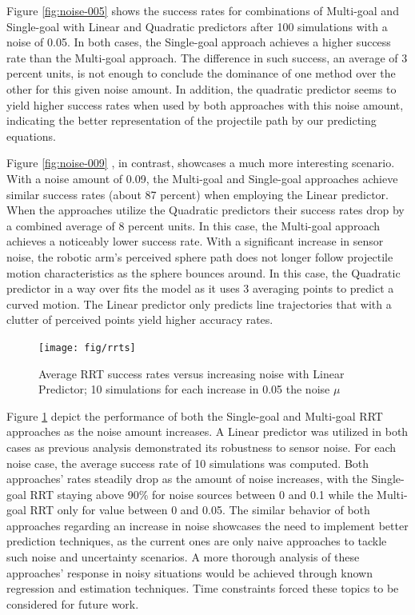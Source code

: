 \documentclass[letterpaper, 10 pt, conference]{ieeeconf}  %
\begin{document}
Figure \ref{fig:noise-005} shows the success rates for combinations of
Multi-goal and Single-goal with Linear and Quadratic predictors after
100 simulations with a noise of 0.05. In both cases, the Single-goal
approach achieves a higher success rate than the Multi-goal approach.
The difference in such success, an average of 3 percent units, is not
enough to conclude the dominance of one method over the other for this
given noise amount. In addition, the quadratic predictor seems to yield
higher success rates when used by both approaches with this noise
amount, indicating the better representation of the projectile path by
our predicting equations.

Figure \ref{fig:noise-009} , in contrast, showcases a much more
interesting scenario. With a noise amount of 0.09, the Multi-goal and
Single-goal approaches achieve similar success rates (about 87 percent)
when employing the Linear predictor. When the approaches utilize the
Quadratic predictors their success rates drop by a combined average of 8
percent units. In this case, the Multi-goal approach achieves a
noticeably lower success rate. With a significant increase in sensor
noise, the robotic arm's perceived sphere path does not longer follow
projectile motion characteristics as the sphere bounces around. In this
case, the Quadratic predictor in a way over fits the model as it uses 3
averaging points to predict a curved motion. The Linear predictor only
predicts line trajectories that with a clutter of perceived points yield
higher accuracy rates.

\begin{figure}
        \centering
        \texttt{[image: fig/rrts]}
        \caption{Average RRT success rates versus increasing noise
        with Linear Predictor; 10 simulations for each increase in 0.05
      the noise $\mu$}\label{fig:rrts}
\end{figure}

Figure \ref{fig:rrts} depict the performance of both the Single-goal and
Multi-goal RRT approaches as the noise amount increases. A Linear
predictor was utilized in both cases as previous analysis demonstrated
its robustness to sensor noise. For each noise case, the average success
rate of 10 simulations was computed. Both approaches’ rates steadily
drop as the amount of noise increases, with the Single-goal RRT staying
above 90\% for noise sources between 0 and 0.1 while the Multi-goal RRT
only for value between 0 and 0.05. The similar behavior of both
approaches regarding an increase in noise showcases the need to
implement better prediction techniques, as the current ones are only
naive approaches to tackle such noise and uncertainty scenarios. A more
thorough analysis of these approaches’ response in noisy situations
would be achieved through known regression and estimation techniques.
Time constraints forced these topics to be considered for future work.
\end{document}
